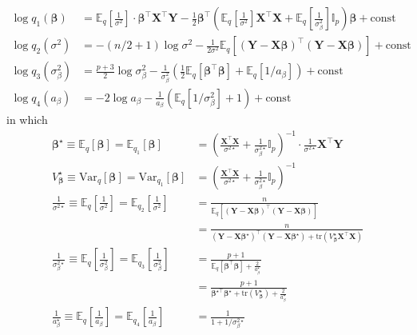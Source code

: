 \documentclass[12pt]{article}
\begin{document}
\begin{align*}
	\log q_1(\bm{\beta}) &= \mathbb{E}_q\left[\frac{1}{\sigma^2} \right]\cdot \bm{\beta}^\top \bm{X}^\top \bm{Y} - \frac{1}{2}\bm{\beta}^\top \left( \mathbb{E}_q\left[\frac{1}{\sigma^2} \right]\bm{X}^\top \bm{X} + \mathbb{E}_q\left[\frac{1}{\sigma_{\beta}^2} \right]\mathbb{I}_p \right) \bm{\beta} + \text{const}\\
	\log q_2(\sigma^2) &= -(n/2+1)\log \sigma^2 - \frac{1}{2\sigma^2} \mathbb{E}_{q}\left[ (\bm{Y} - \bm{X}\bm{\beta})^\top (\bm{Y} - \bm{X}\bm{\beta}) \right] + \text{const} \\
	\log q_3(\sigma_{\beta}^2) &= \frac{p+3}{2}\log \sigma_{\beta}^2 - \frac{1}{\sigma_{\beta}^2}\left( \frac{1}{2}\mathbb{E}_{q}[\bm{\beta}^\top \bm{\beta}] + \mathbb{E}_q[1/a_\beta] \right) + \text{const} \\
	\log q_4(a_\beta) &= -2\log a_\beta - \frac{1}{a_\beta} \left( \mathbb{E}_{q}[1/\sigma_{\beta}^2]+1 \right) + \text{const}
\end{align*}
in which
\begin{align*}
	\bm{\beta}^\star \equiv \mathbb{E}_{q}[\bm{\beta}] = \mathbb{E}_{q_1}[\bm{\beta}] &= \left(\frac{\bm{X}^\top \bm{X}}{\sigma^{2\star}} + \frac{1}{\sigma_{\beta}^{2\star}} \mathbb{I}_{p} \right)^{-1} \cdot \frac{1}{\sigma^{2 \star }}\bm{X}^\top \bm{Y}\\
	V_{\bm{\beta}}^\star \equiv  \text{Var}_q[\bm{\beta}] = \text{Var}_{q_1}[\bm{\beta}] &= \left(\frac{\bm{X}^\top \bm{X}}{\sigma^{2\star}} + \frac{1}{\sigma_{\beta}^{2\star}} \mathbb{I}_{p} \right)^{-1}\\
	\frac{1}{\sigma^{2\star}}\equiv  \mathbb{E}_{q}\left[\frac{1}{\sigma^2} \right] = \mathbb{E}_{q_2}\left[\frac{1}{\sigma^2} \right] &= \frac{n}{\mathbb{E}_q\left[(\bm{Y} - \bm{X}\bm{\beta})^{\top} (\bm{Y} - \bm{X}\bm{\beta})\right]} \\
	&= \frac{n}{(\bm{Y} - \bm{X}\bm{\beta}^\star)^{\top} (\bm{Y} - \bm{X}\bm{\beta}^\star) + \text{tr}(V_{\bm{\beta}}^{\star} \bm{X}^\top \bm{X})} \\
	\frac{1}{\sigma_{\beta}^{2\star}} \equiv \mathbb{E}_{q}\left[\frac{1}{\sigma_{\beta}^2} \right] = \mathbb{E}_{q_3}\left[\frac{1}{\sigma_{\beta}^2} \right]&=\frac{p+1}{\mathbb{E}_q[\bm{\beta}^\top \bm{\beta}] + \frac{2}{a_\beta^\star}}\\
	&= \frac{p+1}{\bm{\beta}^{\star \top} \bm{\beta}^\star + \text{tr}(V_{\bm{\beta}}^\star) + \frac{2}{a_\beta^\star}}\\
	\frac{1}{a_{\beta}^\star} \equiv \mathbb{E}_q\left[ \frac{1}{a_{\beta}} \right] = \mathbb{E}_{q_4}\left[ \frac{1}{a_{\beta}} \right] &= \frac{1}{1+1/\sigma_{\beta}^{2\star}}
\end{align*}
\end{document}
